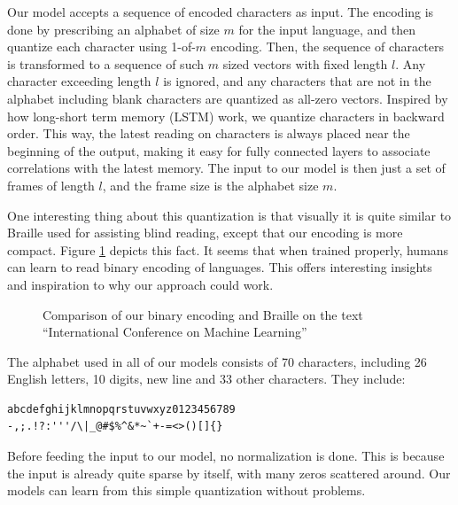 \documentclass{article}
\begin{document}
\begin{CJK}{UTF8}{gbsn}
Our model accepts a sequence of encoded characters as input. The encoding is done by prescribing an alphabet of size \(m\) for the input language, and then quantize each character using 1-of-\(m\) encoding. Then, the sequence of characters is transformed to a sequence of such \(m\) sized vectors with fixed length \(l\). Any character exceeding length \(l\) is ignored, and any characters that are not in the alphabet including blank characters are quantized as all-zero vectors. Inspired by how long-short term memory (LSTM)\cite{HS97} work, we quantize characters in backward order. This way, the latest reading on characters is always placed near the beginning of the output, making it easy for fully connected layers to associate correlations with the latest memory. The input to our model is then just a set of frames of length \(l\), and the frame size is the alphabet size \(m\).

One interesting thing about this quantization is that visually it is quite similar to Braille\cite{B1829} used for assisting blind reading, except that our encoding is more compact. Figure \ref{fig:brai} depicts this fact. It seems that when trained properly, humans can learn to read binary encoding of languages. This offers interesting insights and inspiration to why our approach could work.

\begin{figure}[ht]
  \centering
  \caption{Comparison of our binary encoding and Braille on the text ``International Conference on Machine Learning''}
  \label{fig:brai}
\end{figure}

The alphabet used in all of our models consists of 70 characters, including 26 English letters, 10 digits, new line and 33 other characters. They include:
\begin{verbatim}
abcdefghijklmnopqrstuvwxyz0123456789
-,;.!?:'''/\|_@#$%^&*~`+-=<>()[]{}
\end{verbatim}

Before feeding the input to our model, no normalization is done. This is because the input is already quite sparse by itself, with many zeros scattered around. Our models can learn from this simple quantization without problems.


\end{CJK}
\end{document}
